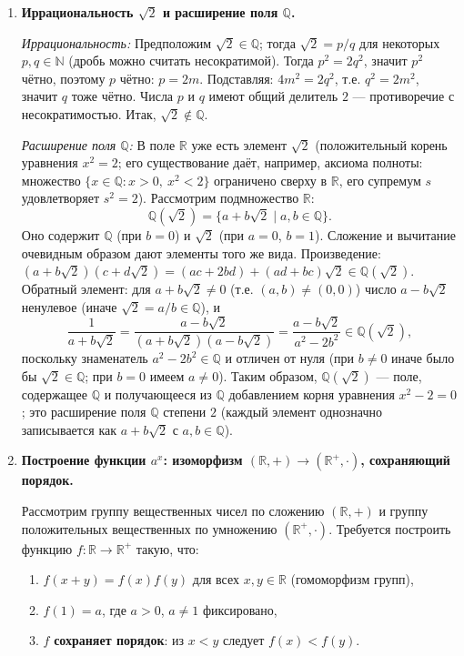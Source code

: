 \documentclass[11pt, a4paper]{extarticle}
\newcommand{\R}{{\mathbb R}}
\newcommand{\Q}{{\mathbb Q}}
\newcommand{\N}{{\mathbb N}}
\begin{document}
\begin{enumerate}[leftmargin=*, label=\textbf{Пример \arabic*.}]
\item \textbf{Иррациональность $\sqrt{2}$ и расширение поля $\Q$.}

\textit{Иррациональность:} Предположим $\sqrt{2} \in \Q$; тогда $\sqrt{2} = p/q$ для некоторых $p, q \in \N$ (дробь можно считать несократимой). Тогда $p^2 = 2q^2$, значит $p^2$ чётно, поэтому $p$ чётно: $p = 2m$. Подставляя: $4m^2 = 2q^2$, т.е. $q^2 = 2m^2$, значит $q$ тоже чётно. Числа $p$ и $q$ имеют общий делитель $2$ --- противоречие с несократимостью. Итак, $\sqrt{2} \notin \Q$.

\textit{Расширение поля $\Q$:} В поле $\R$ уже есть элемент $\sqrt{2}$ (положительный корень уравнения $x^2 = 2$; его существование даёт, например, аксиома полноты: множество $\{ x \in \Q : x > 0,\ x^2 < 2 \}$ ограничено сверху в $\R$, его супремум $s$ удовлетворяет $s^2 = 2$). Рассмотрим подмножество $\R$:
\[
\Q(\sqrt{2}) = \{ a + b\sqrt{2} \mid a, b \in \Q \}.
\]
Оно содержит $\Q$ (при $b=0$) и $\sqrt{2}$ (при $a=0$, $b=1$). Сложение и вычитание очевидным образом дают элементы того же вида. Произведение: $(a + b\sqrt{2})(c + d\sqrt{2}) = (ac + 2bd) + (ad + bc)\sqrt{2} \in \Q(\sqrt{2})$. Обратный элемент: для $a + b\sqrt{2} \neq 0$ (т.е. $(a,b) \neq (0,0)$) число $a - b\sqrt{2}$ ненулевое (иначе $\sqrt{2} = a/b \in \Q$), и
\[
\frac{1}{a + b\sqrt{2}} = \frac{a - b\sqrt{2}}{(a+b\sqrt{2})(a-b\sqrt{2})} = \frac{a - b\sqrt{2}}{a^2 - 2b^2} \in \Q(\sqrt{2}),
\]
поскольку знаменатель $a^2 - 2b^2 \in \Q$ и отличен от нуля (при $b \neq 0$ иначе было бы $\sqrt{2} \in \Q$; при $b=0$ имеем $a \neq 0$). Таким образом, $\Q(\sqrt{2})$ --- поле, содержащее $\Q$ и получающееся из $\Q$ добавлением корня уравнения $x^2 - 2 = 0$; это расширение поля $\Q$ степени $2$ (каждый элемент однозначно записывается как $a + b\sqrt{2}$ с $a,b \in \Q$).

\item \textbf{Построение функции $a^x$: изоморфизм $(\R,+) \to (\R^+, \cdot)$, сохраняющий порядок.}

Рассмотрим группу вещественных чисел по сложению $(\R, +)$ и группу положительных вещественных по умножению $(\R^+, \cdot)$. Требуется построить функцию $f\colon \R \to \R^+$ такую, что:
\begin{enumerate}[label=(\roman*), nosep]
    \item $f(x + y) = f(x) f(y)$ для всех $x, y \in \R$ (гомоморфизм групп),
    \item $f(1) = a$, где $a > 0$, $a \neq 1$ фиксировано,
    \item $f$ \textbf{сохраняет порядок}: из $x < y$ следует $f(x) < f(y)$.
\end{enumerate}


\end{enumerate}
\end{document}
